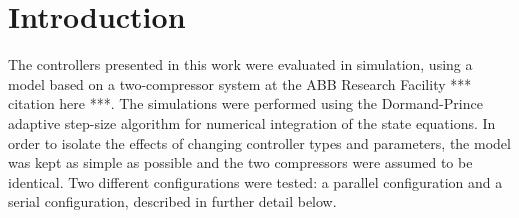 \section{Introduction}

The controllers presented in this work were evaluated in simulation, using a model based on a two-compressor system at the ABB Research Facility *** citation here ***. 
The simulations were performed using the Dormand-Prince adaptive step-size algorithm for numerical integration of the state equations.
In order to isolate the effects of changing controller types and parameters, the model was kept as simple as possible and the two compressors were assumed to be identical.
Two different configurations were tested: a parallel configuration and a serial configuration, described in further detail below.


